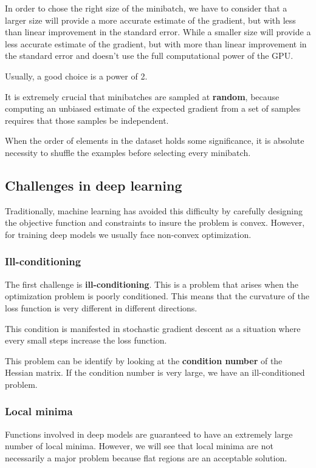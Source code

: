 In order to chose the right size of the minibatch, we have to consider that a
larger size will provide a more accurate estimate of the gradient, but with less
than linear improvement in the standard error. While a smaller size will provide
a less accurate estimate of the gradient, but with more than linear improvement
in the standard error and doesn't use the full computational power of the GPU.

\begin{note}
    Usually, a good choice is a power of 2.
\end{note}

It is extremely crucial that minibatches are sampled at \textbf{random}, because
computing an unbiased estimate of the expected gradient from a set of samples
requires that those samples be independent.

When the order of elements in the dataset holds some significance, it is absolute
necessity to shuffle the examples before selecting every minibatch.
\subsection{Challenges in deep learning}
Traditionally, machine learning has avoided this difficulty by carefully designing
the objective function and constraints to insure the problem is convex. However,
for training deep models we usually face non-convex optimization.
\subsubsection{Ill-conditioning}
The first challenge is \textbf{ill-conditioning}. This is a problem that arises
when the optimization problem is poorly conditioned. This means that the curvature
of the loss function is very different in different directions.

This condition is manifested in stochastic gradient descent as a situation where
every small steps increase the loss function.

This problem can be identify by looking at the \textbf{condition number} of the
Hessian matrix. If the condition number is very large, we have an ill-conditioned
problem.
\subsubsection{Local minima}
Functions involved in deep models are guaranteed to have an extremely large
number of local minima. However, we will see that local minima are not
necessarily a major problem because flat regions are an acceptable solution.

